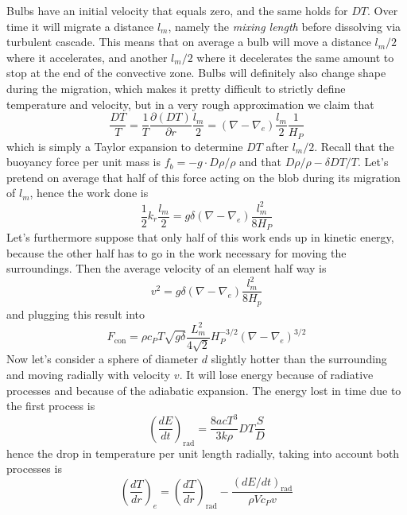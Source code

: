 Bulbs have an initial velocity that equals zero, and the same holds for $DT$. Over time it will migrate a distance $l_m$, namely the \textit{mixing length} before dissolving via turbulent cascade. This means that on average a bulb will move a distance $l_m/2$ where it accelerates, and another $l_m/2$ where it decelerates the same amount to stop at the end of the convective zone. Bulbs will definitely also change shape during the migration, which makes it pretty difficult to strictly define temperature and velocity, but in a very rough approximation we claim that
\begin{equation}
	\frac{DT}{T}=\frac{1}{T}\frac{\partial (DT)}{\partial r} \frac{l_m}{2}=(\nabla-\nabla_e)\frac{l_m}{2}\frac{1}{H_P}
\end{equation}
which is simply a Taylor expansion to determine $DT$ after $l_m/2$. Recall that the buoyancy force per unit mass is $f_b=-g \cdot D \rho / \rho$ and that $D \rho / \rho - \delta D T / T$. Let's pretend on average that half of this force acting on the blob during its migration of $l_m$, hence the work done is
\begin{equation}\label{7.6}
	\frac{1}{2} k_r \frac{l_m}{2}=g \delta (\nabla - \nabla_e)\frac{l_m^2}{8 H_P}
\end{equation}
Let's furthermore suppose that only half of this work ends up in kinetic energy, because the other half has to go in the work necessary for moving the surroundings. Then the average velocity of an element half way is
\begin{equation}
	v^2=g \delta (\nabla - \nabla_e)\frac{l_m^2}{8 H_p}
\end{equation}
and plugging this result into \label{fconv}
\begin{equation}
F_{\mathrm{con}}= \rho c_P T \sqrt{g \delta} \frac{L^2_m}{4\sqrt{2}}H_P^{-3/2} (\nabla-\nabla_e)^{3/2}
\end{equation}
Now let's consider a sphere of diameter $d$ slightly hotter than the surrounding and moving radially with velocity $v$. It will lose energy because of radiative processes and because of the adiabatic expansion. The energy lost in time due to the first process is
\begin{equation}
\left (\frac{d E}{d t}  \right )_{\mathrm{rad}} = \frac{8 a c T^3}{3 k \rho} DT \frac{S}{D}
\end{equation}
hence the drop in temperature per unit length radially, taking into account both processes is
\begin{equation}\label{7.7}
	\left (  \frac{d T}{d r }   \right )_e = \left(  \frac{dT}{d r }   \right )_{\mathrm{rad}} - \frac{\left( d E / dt \right)_{\mathrm{rad}} }{\rho V c_P v}
\end{equation}
